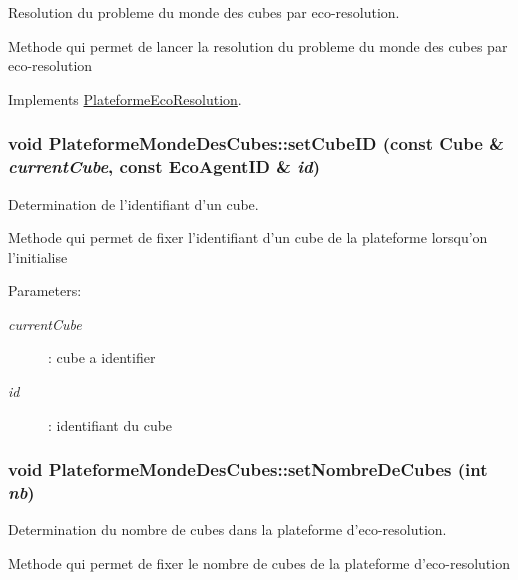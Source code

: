 Resolution du probleme du monde des cubes par eco-resolution. 

Methode qui permet de lancer la resolution du probleme du monde des cubes par eco-resolution 

Implements \hyperlink{classPlateformeEcoResolution_17f587580cd8aee537551bc0ddd82bef}{PlateformeEcoResolution}.\hypertarget{classPlateformeMondeDesCubes_51b3dbb4c3e764231468f1ff19e35a06}{
\subsubsection[{setCubeID}]{\setlength{\rightskip}{0pt plus 5cm}void PlateformeMondeDesCubes::setCubeID (const {\bf Cube} \& {\em currentCube}, \/  const {\bf EcoAgentID} \& {\em id})}}
\label{classPlateformeMondeDesCubes_51b3dbb4c3e764231468f1ff19e35a06}


Determination de l'identifiant d'un cube. 

Methode qui permet de fixer l'identifiant d'un cube de la plateforme lorsqu'on l'initialise

\begin{Desc}
\item[Parameters:]
\begin{description}
\item[{\em currentCube}]: cube a identifier \item[{\em id}]: identifiant du cube \end{description}
\end{Desc}
\hypertarget{classPlateformeMondeDesCubes_e519331088db520a76d1ead67a382c48}{
\subsubsection[{setNombreDeCubes}]{\setlength{\rightskip}{0pt plus 5cm}void PlateformeMondeDesCubes::setNombreDeCubes (int {\em nb})}}
\label{classPlateformeMondeDesCubes_e519331088db520a76d1ead67a382c48}


Determination du nombre de cubes dans la plateforme d'eco-resolution. 

Methode qui permet de fixer le nombre de cubes de la plateforme d'eco-resolution

